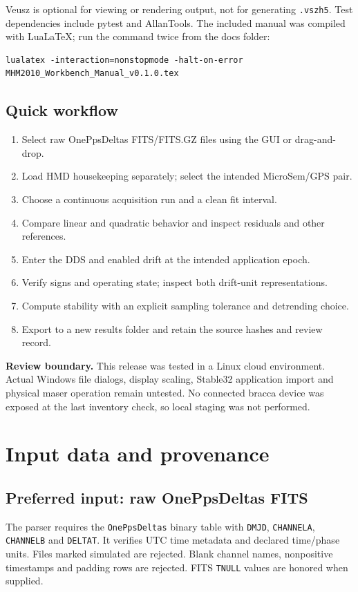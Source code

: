 \documentclass[11pt,a4paper]{article}
\newcommand{\warning}[1]{\par\noindent\colorbox{light}{\parbox{\dimexpr\linewidth-2\fboxsep}{\textbf{Review boundary.} #1}}\par}
\begin{document}
Veusz is optional for viewing or rendering output, not for generating
\texttt{.vszh5}. Test dependencies include pytest and AllanTools. The included
manual was compiled with LuaLaTeX; run the command twice from the docs folder:
\begin{lstlisting}
lualatex -interaction=nonstopmode -halt-on-error MHM2010_Workbench_Manual_v0.1.0.tex
\end{lstlisting}

\subsection{Quick workflow}
\begin{enumerate}[leftmargin=6mm,itemsep=4pt]
\item Select raw OnePpsDeltas FITS/FITS.GZ files using the GUI or drag-and-drop.
\item Load HMD housekeeping separately; select the intended MicroSem/GPS pair.
\item Choose a continuous acquisition run and a clean fit interval.
\item Compare linear and quadratic behavior and inspect residuals and other references.
\item Enter the DDS and enabled drift at the intended application epoch.
\item Verify signs and operating state; inspect both drift-unit representations.
\item Compute stability with an explicit sampling tolerance and detrending choice.
\item Export to a new results folder and retain the source hashes and review record.
\end{enumerate}

\warning{This release was tested in a Linux cloud environment. Actual Windows
file dialogs, display scaling, Stable32 application import and physical
maser operation remain untested. No connected bracca device was exposed at the
last inventory check, so local staging was not performed.}
\clearpage

\section{Input data and provenance}
\subsection{Preferred input: raw OnePpsDeltas FITS}
The parser requires the \texttt{OnePpsDeltas} binary table with \texttt{DMJD},
\texttt{CHANNELA}, \texttt{CHANNELB} and \texttt{DELTAT}. It verifies UTC time
metadata and declared time/phase units. Files marked simulated are rejected.
Blank channel names, nonpositive timestamps and padding rows are rejected.
FITS \texttt{TNULL} values are honored when supplied.
\end{document}
